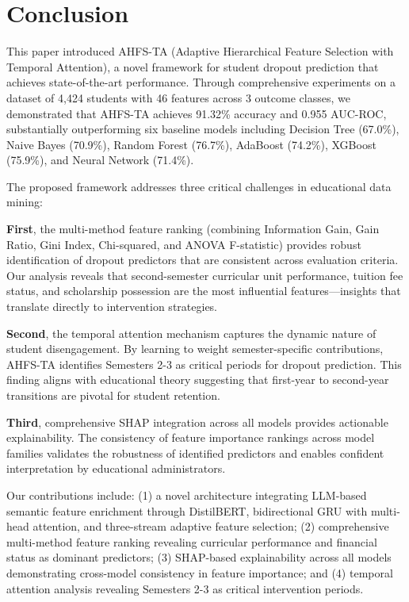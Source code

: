 \documentclass[journal]{IEEEtran}
\begin{document}
\section{Conclusion}

This paper introduced AHFS-TA (Adaptive Hierarchical Feature Selection with Temporal Attention), a novel framework for student dropout prediction that achieves state-of-the-art performance. Through comprehensive experiments on a dataset of 4,424 students with 46 features across 3 outcome classes, we demonstrated that AHFS-TA achieves 91.32\% accuracy and 0.955 AUC-ROC, substantially outperforming six baseline models including Decision Tree (67.0\%), Naive Bayes (70.9\%), Random Forest (76.7\%), AdaBoost (74.2\%), XGBoost (75.9\%), and Neural Network (71.4\%).

The proposed framework addresses three critical challenges in educational data mining:

\textbf{First}, the multi-method feature ranking (combining Information Gain, Gain Ratio, Gini Index, Chi-squared, and ANOVA F-statistic) provides robust identification of dropout predictors that are consistent across evaluation criteria. Our analysis reveals that second-semester curricular unit performance, tuition fee status, and scholarship possession are the most influential features---insights that translate directly to intervention strategies.

\textbf{Second}, the temporal attention mechanism captures the dynamic nature of student disengagement. By learning to weight semester-specific contributions, AHFS-TA identifies Semesters 2-3 as critical periods for dropout prediction. This finding aligns with educational theory suggesting that first-year to second-year transitions are pivotal for student retention.

\textbf{Third}, comprehensive SHAP integration across all models provides actionable explainability. The consistency of feature importance rankings across model families validates the robustness of identified predictors and enables confident interpretation by educational administrators.

Our contributions include: (1) a novel architecture integrating LLM-based semantic feature enrichment through DistilBERT, bidirectional GRU with multi-head attention, and three-stream adaptive feature selection; (2) comprehensive multi-method feature ranking revealing curricular performance and financial status as dominant predictors; (3) SHAP-based explainability across all models demonstrating cross-model consistency in feature importance; and (4) temporal attention analysis revealing Semesters 2-3 as critical intervention periods.
\end{document}
